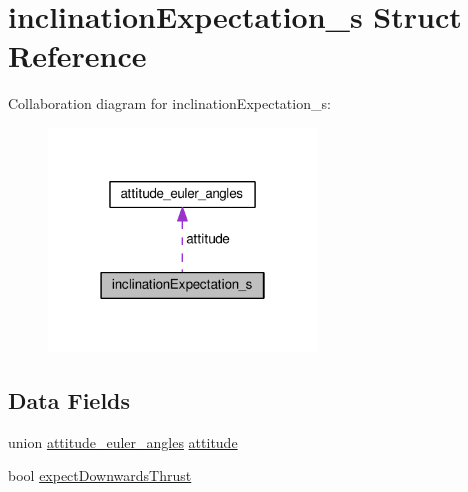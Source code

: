 \hypertarget{structinclinationExpectation__s}{\section{inclination\+Expectation\+\_\+s Struct Reference}
\label{structinclinationExpectation__s}
}


Collaboration diagram for inclination\+Expectation\+\_\+s\+:\nopagebreak
\begin{figure}[H]
\begin{center}
\leavevmode
\includegraphics[width=202pt]{structinclinationExpectation__s__coll__graph}
\end{center}
\end{figure}
\subsection*{Data Fields}
\begin{DoxyCompactItemize}
\item 
union \hyperlink{unionattitude__euler__angles}{attitude\+\_\+euler\+\_\+angles} \hyperlink{structinclinationExpectation__s_a1b41512fcf82234335864f3ed020a739}{attitude}
\item 
bool \hyperlink{structinclinationExpectation__s_a923e87d7d923f8a328ba15a25ae393d5}{expect\+Downwards\+Thrust}
\end{DoxyCompactItemize}


